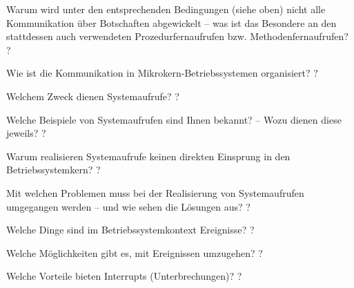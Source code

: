 \documentclass[avery5371]{flashcards}
\begin{document}
\begin{flashcard}[Fernaufrufe]{Warum wird unter den entsprechenden Bedingungen (siehe oben) nicht alle Kommunikation über Botschaften abgewickelt – was ist das Besondere an den stattdessen auch verwendeten Prozedurfernaufrufen bzw. Methodenfernaufrufen?}
    ?
\end{flashcard}

\begin{flashcard}[Fernaufrufe]{Wie ist die Kommunikation in Mikrokern-Betriebssystemen organisiert?}
    ?
\end{flashcard}

\begin{flashcard}[Systemaufrufe]{Welchem Zweck dienen Systemaufrufe?}
    ?
\end{flashcard}

\begin{flashcard}[Systemaufrufe]{Welche Beispiele von Systemaufrufen sind Ihnen bekannt? – Wozu dienen diese jeweils?}
    ?
\end{flashcard}

\begin{flashcard}[Systemaufrufe]{Warum realisieren Systemaufrufe keinen direkten Einsprung in den Betriebssystemkern?}
    ?
\end{flashcard}

\begin{flashcard}[Systemaufrufe]{Mit welchen Problemen muss bei der Realisierung von Systemaufrufen umgegangen werden – und wie sehen die Lösungen aus?}
    ?
\end{flashcard}

\begin{flashcard}{Welche Dinge sind im Betriebssystemkontext Ereignisse?}
    ?
\end{flashcard}

\begin{flashcard}{Welche Möglichkeiten gibt es, mit Ereignissen umzugehen?}
    ?
\end{flashcard}

\begin{flashcard}{Welche Vorteile bieten Interrupts (Unterbrechungen)?}
    ?
\end{flashcard}
\end{document}
